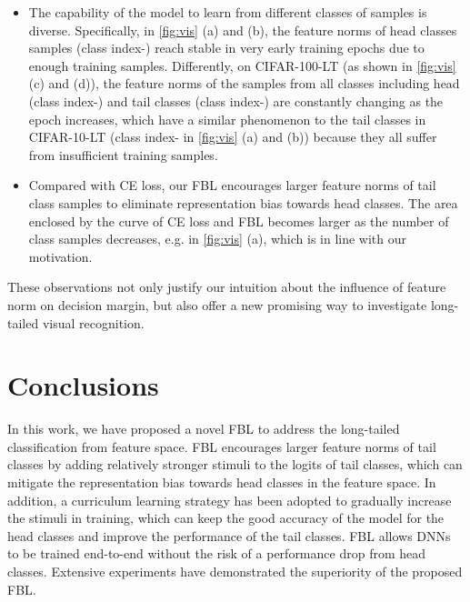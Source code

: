 \documentclass{article}
\begin{document}
\begin{itemize}[leftmargin=*]
    \item The capability of the model to learn from different classes of samples is diverse. Specifically, in \cref{fig:vis} (a) and (b), the feature norms of head classes samples (class index-) reach stable in very early training epochs due to enough training samples. Differently, on CIFAR-100-LT (as shown in \cref{fig:vis} (c) and (d)), the feature norms of the samples from all classes including head (class index-) and tail classes (class index-) are constantly changing as the epoch increases, which have a similar phenomenon to the tail classes in CIFAR-10-LT (class index- in \cref{fig:vis} (a) and (b)) because they all suffer from insufficient training samples.
    \item Compared with CE loss, our FBL encourages larger feature norms of tail class samples to eliminate representation bias towards head classes. The area  enclosed by the curve of CE loss and FBL becomes larger as the number of class samples decreases, e.g.  in \cref{fig:vis} (a), which is in line with our motivation.
\end{itemize}
These observations not only justify our intuition about the influence of feature norm on decision margin, but also offer a new promising way to investigate long-tailed visual recognition.

\section{Conclusions}
\label{sec:conclusion}
In this work, we have proposed a novel FBL to address the long-tailed classification from feature space. FBL encourages larger feature norms of tail classes by adding relatively stronger stimuli to the logits of tail classes, which can mitigate the representation bias towards head classes in the feature space. In addition, a curriculum learning strategy has been adopted to gradually increase the stimuli in training, which can keep the good accuracy of the model for the head classes and improve the performance of the tail classes. FBL allows DNNs to be trained end-to-end without the risk of a performance drop from head classes. Extensive experiments have demonstrated the superiority of the proposed FBL.



\end{document}
